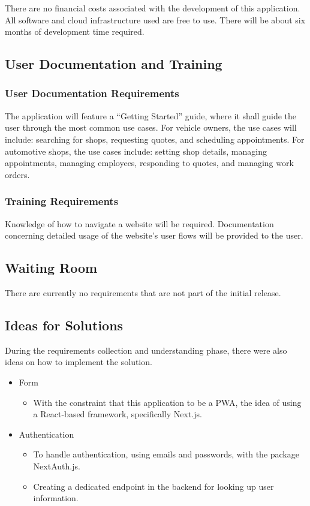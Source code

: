 \documentclass[12pt]{article}
\begin{document}
There are no financial costs associated with the development of this application. All software and
cloud infrastructure used are free to use. There will be about six months of development time
required.

\subsection{User Documentation and Training}
\subsubsection{User Documentation Requirements}

The application will feature a ``Getting Started'' guide, where it shall guide the user through the
most common use cases. For vehicle owners, the use cases will include: searching for shops,
requesting quotes, and scheduling appointments. For automotive shops, the use cases include:
setting shop details, managing appointments, managing employees, responding to quotes, and managing
work orders.

\subsubsection{Training Requirements}

Knowledge of how to navigate a website will be required. Documentation concerning detailed usage of
the website's user flows will be provided to the user.

\subsection{Waiting Room}

There are currently no requirements that are not part of the initial release.

\subsection{Ideas for Solutions}

During the requirements collection and understanding phase, there were also ideas on how to
implement the solution.

\begin{itemize}
	\item Form
	      \begin{itemize}
		      \item With the constraint that this application to be a PWA, the idea of using a React-based framework,
		            specifically Next.js.
	      \end{itemize}
	\item Authentication
	      \begin{itemize}
		      \item To handle authentication, using emails and passwords, with the package NextAuth.js.
		      \item Creating a dedicated endpoint in the backend for looking up user information.
	      \end{itemize}
\end{itemize}
\end{document}
